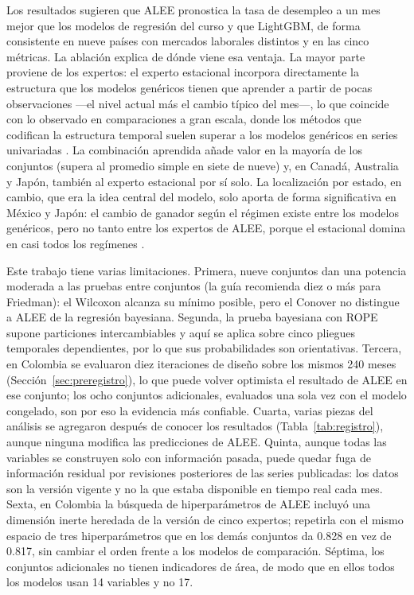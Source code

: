 \documentclass[11pt]{article}
\begin{document}
Los resultados sugieren que ALEE pronostica la tasa de desempleo a un mes mejor que los modelos de regresión del curso y que LightGBM, de forma consistente en nueve países con mercados laborales distintos y en las cinco métricas. La ablación explica de dónde viene esa ventaja. La mayor parte proviene de los expertos: el experto estacional incorpora directamente la estructura que los modelos genéricos tienen que aprender a partir de pocas observaciones ---el nivel actual más el cambio típico del mes---, lo que coincide con lo observado en comparaciones a gran escala, donde los métodos que codifican la estructura temporal suelen superar a los modelos genéricos en series univariadas \cite{makridakis2018,makridakis2020}. La combinación aprendida añade valor en la mayoría de los conjuntos (supera al promedio simple en siete de nueve) y, en Canadá, Australia y Japón, también al experto estacional por sí solo. La localización por estado, en cambio, que era la idea central del modelo, solo aporta de forma significativa en México y Japón: el cambio de ganador según el régimen existe entre los modelos genéricos, pero no tanto entre los expertos de ALEE, porque el estacional domina en casi todos los regímenes \cite{elliotttimmermann2005,timmermann2006}.

Este trabajo tiene varias limitaciones. Primera, nueve conjuntos dan una potencia moderada a las pruebas entre conjuntos (la guía recomienda diez o más para Friedman): el Wilcoxon alcanza su mínimo posible, pero el Conover no distingue a ALEE de la regresión bayesiana. Segunda, la prueba bayesiana con ROPE supone particiones intercambiables y aquí se aplica sobre cinco pliegues temporales dependientes, por lo que sus probabilidades son orientativas. Tercera, en Colombia se evaluaron diez iteraciones de diseño sobre los mismos 240 meses (Sección~\ref{sec:preregistro}), lo que puede volver optimista el resultado de ALEE en ese conjunto; los ocho conjuntos adicionales, evaluados una sola vez con el modelo congelado, son por eso la evidencia más confiable. Cuarta, varias piezas del análisis se agregaron después de conocer los resultados (Tabla~\ref{tab:registro}), aunque ninguna modifica las predicciones de ALEE. Quinta, aunque todas las variables se construyen solo con información pasada, puede quedar fuga de información residual por revisiones posteriores de las series publicadas: los datos son la versión vigente y no la que estaba disponible en tiempo real cada mes. Sexta, en Colombia la búsqueda de hiperparámetros de ALEE incluyó una dimensión inerte heredada de la versión de cinco expertos; repetirla con el mismo espacio de tres hiperparámetros que en los demás conjuntos da 0.828 en vez de 0.817, sin cambiar el orden frente a los modelos de comparación. Séptima, los conjuntos adicionales no tienen indicadores de área, de modo que en ellos todos los modelos usan 14 variables y no 17.
\end{document}
